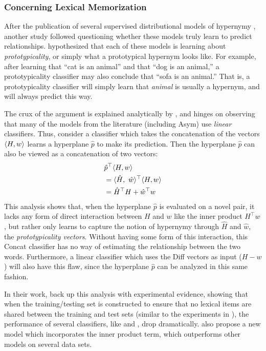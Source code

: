 \documentclass[12pt]{article}
\begin{document}
\subsubsection{Concerning Lexical Memorization}
\label{sec:lexmem}

After the publication of several supervised distributional models of hypernymy
\cite{baroni:2011:gems,fu:2014:acl,roller:2014:coling,weeds:2014:coling},
another study followed questioning whether these models truly learn to predict
relationships.  hypothesized that each of these models
is learning about {\em prototypicality}, or simply what a prototypical
hypernym looks like. For example, after learning that ``cat is an animal''
and that ``dog is an animal,'' a prototypicality classifier may also conclude
that ``sofa is an animal.'' That is, a prototypicality classifier will
simply learn that {\em animal} is usually a hypernym, and will always
predict this way.

The crux of the argument is explained analytically by
, and hinges on observing that many of the models from
the literature (including Asym) use {\em linear} classifiers. Thus, consider a
classifier which takes the concatenation of the vectors $\langle H, w\rangle$ learns a
hyperplane $\hat p$ to make its prediction. Then the hyperplane $\hat p$ can
also be viewed as a concatenation of two vectors:
\begin{align*}
  & \hat p^\top \langle H, w\rangle\\
  & = \langle \hat H,~\hat w\rangle^\top \langle H, w\rangle\\
  & = \hat H^\top H + \hat w^\top w
\end{align*}
This analysis shows that, when the hyperplane $\hat p$ is evaluated on a novel
pair, it lacks any form of direct interaction between $H$ and $w$ like the
inner product $H^\top w$, but rather only learns to capture the notion of
hypernymy through $\hat H$ and $\hat w$, the {\em prototypicality vectors}.
Without having some form of this interaction, this Concat classifier has no way
of estimating the relationship between the two words. Furthermore, a linear classifier
which uses the Diff vectors as input ($H - w$) will also have this flaw,
since the hyperplane $\hat p$ can be analyzed in this same fashion.

In their work,  back up this analysis with experimental
evidence, showing that when the training/testing set is constructed to
ensure that no lexical items are shared between the training and test sets
(similar to the experiments in ), the performance
of several classifiers, like  and
, drop dramatically.  also
propose a new model which incorporates the inner product term, which
outperforms other models on several data sets.
\end{document}
